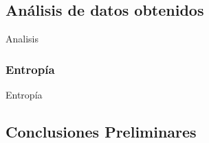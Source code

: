 \subsection{An\'alisis de datos obtenidos}
	\par Analisis

	\subsubsection{Entrop\'ia}
		\par Entrop\'ia

\subsection{Conclusiones Preliminares}